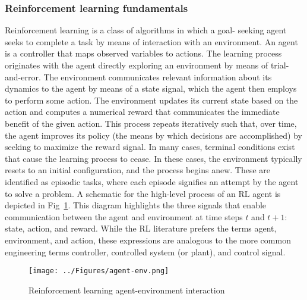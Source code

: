 \documentclass[conference]{IEEEtran}
\begin{document}
\subsubsection{Reinforcement learning fundamentals}
Reinforcement learning is a class of algorithms in which a goal- seeking agent seeks to complete a task by means of interaction with an environment. An agent is a controller that maps observed variables to actions. The learning process originates with the agent directly exploring an environment by means of trial-and-error. The environment communicates relevant information about its dynamics to the agent by means of a state signal, which the agent then employs to perform some action. The environment updates its current state based on the action and computes a numerical reward that communicates the immediate benefit of the given action. This process repeats iteratively such that, over time, the agent improves its policy (the means by which decisions are accomplished) by seeking to maximize the reward signal. In many cases, terminal conditions exist that cause the learning process to cease. In these cases, the environment typically resets to an initial configuration, and the process begins anew. These are identified as episodic tasks, where each episode signifies an attempt by the agent to solve a problem. A schematic for the high-level process of an RL agent is depicted in Fig~\ref{fig:agent-env}. This diagram highlights the three signals that enable communication between the agent and environment at time steps \(t\) and \(t+1\): state, action, and reward. While the RL literature prefers the terms agent, environment, and action, these expressions are analogous to the more common engineering terms controller, controlled system (or plant), and control signal.
\begin{figure}[H]
    \centering
    \texttt{[image: ../Figures/agent-env.png]}
    \caption{Reinforcement learning agent-environment interaction}
    \label{fig:agent-env}
\end{figure}
\end{document}
